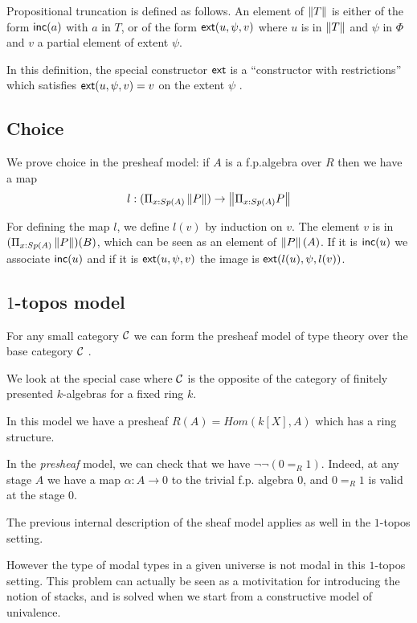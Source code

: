 \medskip    

Propositional truncation is defined as follows. An element of $\left\lVert T \right\rVert$ is either of the form
$\mathsf{inc}(a)$ with $a$ in $T$, or of the form $\mathsf{ext}(u,\psi,v)$ where $u$ is in $\left\lVert T \right\rVert$ and $\psi$
in $\Phi$ and $v$ a partial element of extent $\psi$.

In this definition, the special constructor $\mathsf{ext}$ is a ``constructor with restrictions'' which
satisfies $\mathsf{ext}(u,\psi,v) = v$ on the extent $\psi$ \cite{CoquandHM18}.

\subsection{Choice}

We prove choice in the presheaf model: if $A$ is a f.p.\@ algebra over $R$ then we have a map
$$
l:(\Pi_{x:Sp(A)}\left\lVert P \right\rVert)\rightarrow \left\lVert \Pi_{x:Sp(A)}P \right\rVert
$$

For defining the map $l$, we define $l(v)$ by induction on $v$.
The element $v$ is in $(\Pi_{x:Sp(A)}\left\lVert P \right\rVert)(B)$, which can be seen as
an element of $\left\lVert P \right\rVert(A)$. If it is $\mathsf{inc}(u)$ we associate $\mathsf{inc}(u)$ and 
if it is $\mathsf{ext}(u,\psi,v)$ the image is $\mathsf{ext}(l(u),\psi,l(v))$.

\subsection{$1$-topos model}

For any small category $\mathcal{C}$ we can form the presheaf model of type theory over the base category $\mathcal{C}$ \cite{hofmann,huber-phd-thesis}.

\medskip

We look at the special case where $\mathcal{C}$ is the opposite of the category of finitely presented $k$-algebras for a fixed
ring $k$.

    In this model we have a presheaf $R(A) = Hom(k[X],A)$ which has a ring structure.

    In the {\em presheaf} model, we can check that we have $\neg\neg (0=_R 1)$. Indeed, at any stage $A$ we have
    a map $\alpha:A\rightarrow 0$ to the trivial f.p. algebra $0$, and $0 =_R 1$ is valid at the stage $0$.

    The previous internal description of the sheaf model applies as well in the $1$-topos setting.

    \medskip

    However the type of modal types in a given universe is not modal in this $1$-topos setting. This problem can actually be seen as a
    motivitation for introducing the notion of stacks, and is solved when we start from a constructive model of univalence.


